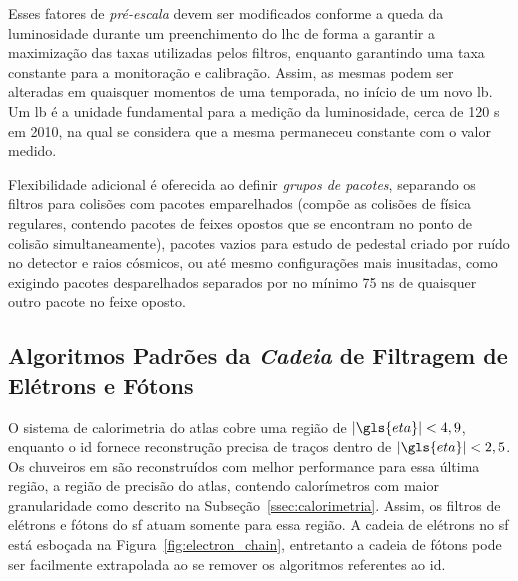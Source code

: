 
Esses fatores de \emph{pré-escala} devem ser modificados conforme a queda da
luminosidade durante um preenchimento do \gls{lhc} de forma a garantir a
maximização das taxas utilizadas pelos filtros, enquanto garantindo uma taxa
constante para a monitoração e calibração. Assim, as mesmas podem ser alteradas
em quaisquer momentos de uma temporada, no início de um novo \gls{lb}. Um
\gls{lb} é a unidade fundamental para a medição da luminosidade, cerca de 120 s
em 2010, na qual se considera que a mesma permaneceu constante com o valor
medido.

Flexibilidade adicional é oferecida ao definir \emph{grupos de pacotes}, separando os
filtros para colisões com pacotes emparelhados (compõe as colisões de física
regulares, contendo pacotes de feixes opostos que se encontram no ponto de
colisão simultaneamente), pacotes vazios para estudo de pedestal criado por ruído 
no detector e raios cósmicos, ou até mesmo configurações mais inusitadas, como 
exigindo pacotes desparelhados separados por no mínimo 75 ns de quaisquer outro 
pacote no feixe oposto.

\subsection{Algoritmos Padrões da \emph{Cadeia} de Filtragem de Elétrons e Fótons}
\label{ssec:cadeia_egamma}


O sistema de calorimetria do \gls{atlas} cobre uma região de $|\gls{eta}| <
4,9$, enquanto o \gls{id} fornece reconstrução precisa de traços dentro de
$|\gls{eta}| < 2,5$. Os chuveiros \gls{em} são reconstruídos com melhor
performance para essa última região, a região de precisão do \gls{atlas}, 
contendo calorímetros com maior granularidade como descrito na
Subseção~\ref{ssec:calorimetria}. Assim, os filtros de elétrons e fótons
\cite{expected_perf_2011,perf_2011} do \gls{sf} atuam somente para essa região.
A cadeia de elétrons no \gls{sf} está esboçada na Figura~\ref{fig:electron_chain}, entretanto
a cadeia de fótons pode ser facilmente extrapolada ao se remover os algoritmos
referentes ao \gls{id}.

